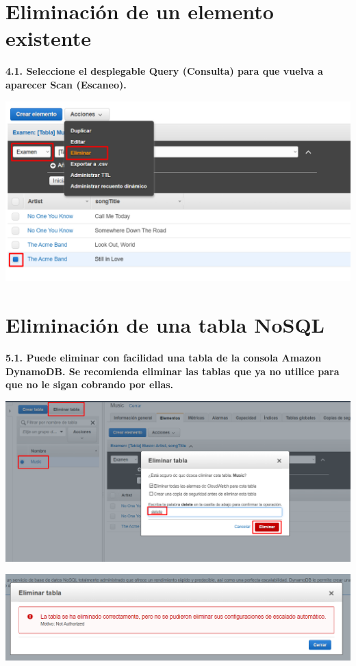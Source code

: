\documentclass{article}
\begin{document}
\newpage


\section{Eliminación de un elemento existente }

\textbf{4.1. Seleccione el desplegable Query (Consulta) para que vuelva a aparecer Scan (Escaneo).   }

    \begin{center}
		\includegraphics[width=15cm]{./images/14} 
	\end{center}

\newpage

\section{Eliminación de una tabla NoSQL }

\textbf{5.1. Puede eliminar con facilidad una tabla de la consola Amazon DynamoDB. Se recomienda eliminar las tablas que ya no utilice para que no le sigan cobrando por ellas. }
 \begin{center}
		\includegraphics[width=15cm]{./images/15} 
	\end{center}
 \begin{center}
		\includegraphics[width=15cm]{./images/16} 
	\end{center}
\end{document}
